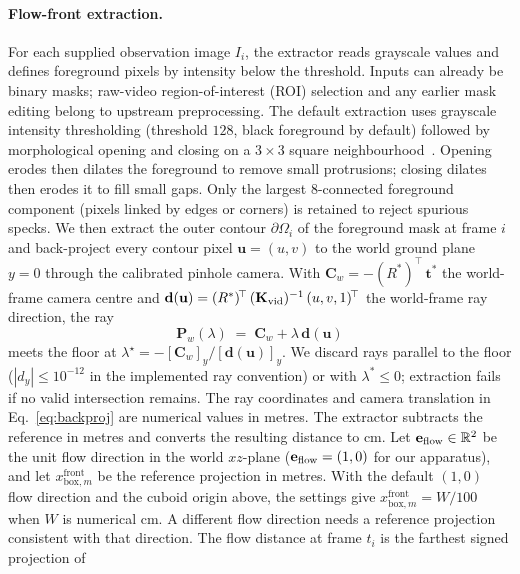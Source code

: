 \paragraph{Flow-front extraction.}
For each supplied observation image $I_i$, the extractor reads
grayscale values and defines foreground pixels by intensity below the
threshold. Inputs can already be binary masks; raw-video region-of-interest (ROI) selection
and any earlier mask editing belong to upstream preprocessing. The
default extraction uses grayscale intensity thresholding
(threshold $128$, black
foreground by default) followed by morphological opening and closing
on a $3\times3$ square neighbourhood~\cite{gonzalez2018digital}.
Opening erodes then dilates the foreground to remove small protrusions;
closing dilates then erodes it to fill small gaps. Only the largest
8-connected foreground component (pixels linked by edges or corners) is retained to reject spurious
specks. We then extract the outer contour $\partial\Omega_{i}$ of
the foreground mask at frame $i$ and back-project every contour
pixel $\mathbf{u} = (u, v)$ to the world ground plane $y = 0$
through the calibrated pinhole camera. With
$\mathbf{C}_{w} = -(R^*)^{\!\top}\,\mathbf{t}^*$ the world-frame camera
centre and
$\mathbf{d}(\mathbf{u}) = (R^*)^{\!\top}\,(\mathbf{K}_{\rm vid})^{-1}
\,(u, v, 1)^{\!\top}$
the world-frame ray direction, the ray
\begin{equation}
\label{eq:backproj}
    \mathbf{P}_{w}(\lambda)
    \;=\; \mathbf{C}_{w} + \lambda\,\mathbf{d}(\mathbf{u})
\end{equation}
meets the floor at
$\lambda^{\star} = -[\mathbf{C}_{w}]_{y}/[\mathbf{d}(\mathbf{u})]_{y}$.
We discard rays parallel to the floor ($|d_y|\leq10^{-12}$ in
the implemented ray convention) or with $\lambda^*\leq0$; extraction
fails if no valid intersection remains. The ray coordinates and camera translation in
Eq.~\eqref{eq:backproj} are numerical values in metres. The extractor
subtracts the reference in metres and converts the resulting distance
to cm. Let
$\mathbf{e}_{\rm flow} \in \mathbb{R}^{2}$ be the unit flow direction in
the world $xz$-plane ($\mathbf{e}_{\rm flow} = (1, 0)$ for our apparatus), and
let $x^{\mathrm{front}}_{\mathrm{box},m}$ be the reference projection
in metres. With the default $(1,0)$ flow direction and the cuboid origin
above, the settings give $x^{\mathrm{front}}_{\mathrm{box},m}=W/100$
when $W$ is numerical cm. A different flow direction needs a reference
projection consistent with that direction. The flow
distance at frame $t_{i}$ is the farthest signed projection of
